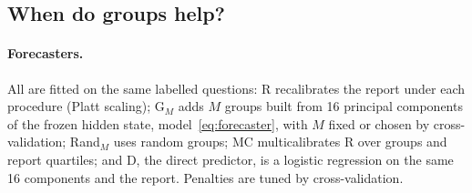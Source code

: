 \documentclass[twoside]{article}
\theoremstyle{definition}
\theoremstyle{remark}
\newcommand{\1}{\mathbf{1}}
\begin{document}
\subsection{When do groups help?}
\label{sec:e5}
\paragraph{Forecasters.} All are fitted on the same labelled questions: R recalibrates the report
under each procedure (Platt scaling); G$_M$ adds $M$ groups built from 16 principal components of the frozen
hidden state, model~\eqref{eq:forecaster}, with $M$ fixed or chosen by cross-validation; Rand$_M$ uses random
groups; MC multicalibrates R over groups and report quartiles; and D, the direct predictor, is a logistic
regression on the same 16 components and the report. Penalties are tuned by cross-validation.
\end{document}
